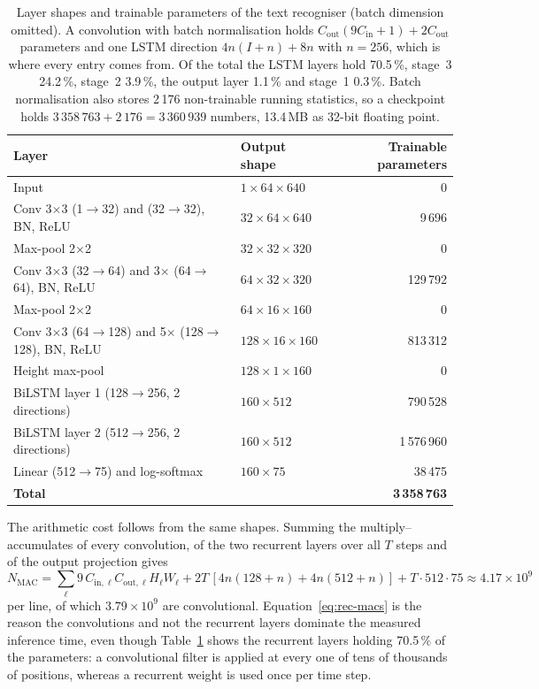 \begin{table}[h]
\centering
\fontsize{8.5}{10.2}\selectfont
\setlength{\tabcolsep}{4pt}
\begin{tabular}{|l|l|r|}
\hline
\textbf{Layer} & \textbf{Output shape} & \textbf{Trainable parameters} \\
\hline
Input & $1\times64\times640$ & 0 \\
Conv 3$\times$3 (1$\to$32) and (32$\to$32), BN, ReLU & $32\times64\times640$ & 9\,696 \\
Max-pool 2$\times$2 & $32\times32\times320$ & 0 \\
Conv 3$\times$3 (32$\to$64) and 3$\times$ (64$\to$64), BN, ReLU & $64\times32\times320$ & 129\,792 \\
Max-pool 2$\times$2 & $64\times16\times160$ & 0 \\
Conv 3$\times$3 (64$\to$128) and 5$\times$ (128$\to$128), BN, ReLU & $128\times16\times160$ & 813\,312 \\
Height max-pool & $128\times1\times160$ & 0 \\
BiLSTM layer 1 (128$\to$256, 2 directions) & $160\times512$ & 790\,528 \\
BiLSTM layer 2 (512$\to$256, 2 directions) & $160\times512$ & 1\,576\,960 \\
Linear (512$\to$75) and log-softmax & $160\times75$ & 38\,475 \\
\hline
\textbf{Total} & & \textbf{3\,358\,763} \\
\hline
\end{tabular}
\caption{Layer shapes and trainable parameters of the text recogniser (batch dimension omitted). A convolution with batch normalisation holds $C_{\mathrm{out}}(9C_{\mathrm{in}}+1)+2C_{\mathrm{out}}$ parameters and one LSTM direction $4n(I+n)+8n$ with $n=256$, which is where every entry comes from. Of the total the LSTM layers hold 70.5\,\%, stage~3 24.2\,\%, stage~2 3.9\,\%, the output layer 1.1\,\% and stage~1 0.3\,\%. Batch normalisation also stores 2\,176 non-trainable running statistics, so a checkpoint holds $3\,358\,763+2\,176=3\,360\,939$ numbers, 13.4\,MB as 32-bit floating point.}
\label{tab:rec-layers}
\end{table}

The arithmetic cost follows from the same shapes.
Summing the multiply--accumulates of every convolution, of the two recurrent layers over all $T$ steps and of the output projection gives
\begin{equation}
N_{\mathrm{MAC}}=\sum_\ell 9\,C_{\mathrm{in},\ell}C_{\mathrm{out},\ell}H_\ell W_\ell+2T\,[4n(128+n)+4n(512+n)]+T\cdot512\cdot75\approx4.17\times10^9
\label{eq:rec-macs}
\end{equation}
per line, of which $3.79\times10^9$ are convolutional.
Equation~\ref{eq:rec-macs} is the reason the convolutions and not the recurrent layers dominate the measured inference time, even though Table~\ref{tab:rec-layers} shows the recurrent layers holding 70.5\,\% of the parameters: a convolutional filter is applied at every one of tens of thousands of positions, whereas a recurrent weight is used once per time step.

